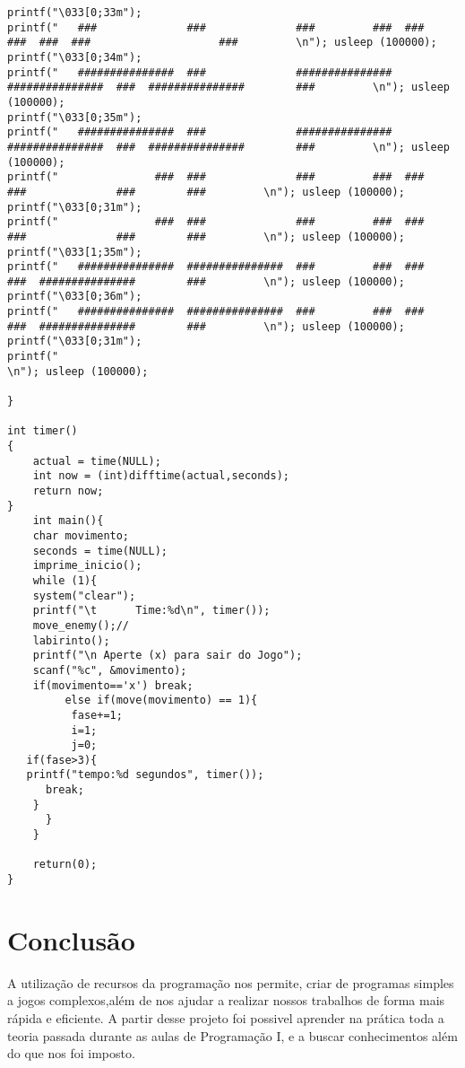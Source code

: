 \documentclass[journal]{IEEEtran}
\begin{document}
\begin{verbatim}
printf("\033[0;33m");
printf("   ###              ###              ###         ###  ###         ###  ###  ###                    ###         \n"); usleep (100000);
printf("\033[0;34m");
printf("   ###############  ###              ###############  ###############  ###  ###############        ###         \n"); usleep (100000);
printf("\033[0;35m");
printf("   ###############  ###              ###############  ###############  ###  ###############        ###         \n"); usleep (100000);
printf("               ###  ###              ###         ###  ###              ###              ###        ###         \n"); usleep (100000);
printf("\033[0;31m");
printf("               ###  ###              ###         ###  ###              ###              ###        ###         \n"); usleep (100000);
printf("\033[1;35m");
printf("   ###############  ###############  ###         ###  ###              ###  ###############        ###         \n"); usleep (100000);
printf("\033[0;36m");
printf("   ###############  ###############  ###         ###  ###              ###  ###############        ###         \n"); usleep (100000);
printf("\033[0;31m");
printf("                                                                                                               \n"); usleep (100000);

}

int timer()
{
	actual = time(NULL);
	int now = (int)difftime(actual,seconds);
	return now;
}
    int main(){
    char movimento;	
    seconds = time(NULL);
    imprime_inicio();
    while (1){
    system("clear");
    printf("\t      Time:%d\n", timer());
    move_enemy();//
    labirinto();
    printf("\n Aperte (x) para sair do Jogo");
    scanf("%c", &movimento);
    if(movimento=='x') break;
         else if(move(movimento) == 1){
          fase+=1;
          i=1;
          j=0;	
   if(fase>3){
   printf("tempo:%d segundos", timer());
      break;
	}
      }
    }

    return(0);
}
\end{verbatim}



\section{Conclusão }
A utilização de recursos da programação nos permite, criar  de programas simples a jogos complexos,além de nos ajudar a realizar nossos trabalhos de forma mais rápida e eficiente. A partir desse projeto foi possivel aprender na prática toda a teoria passada durante as aulas de Programação I, e a buscar conhecimentos além do que nos foi imposto.
\end{document}
